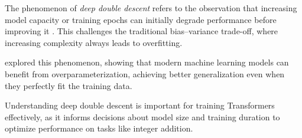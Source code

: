 The phenomenon of \emph{deep double descent} refers to the observation that increasing model capacity or training epochs can initially degrade performance before improving it \parencite{nakkiran_deep_2021}. This challenges the traditional bias–variance trade-off, where increasing complexity always leads to overfitting.

\textcite{belkin_reconciling_2019} explored this phenomenon, showing that modern machine learning models can benefit from overparameterization, achieving better generalization even when they perfectly fit the training data.

Understanding deep double descent is important for training Transformers effectively, as it informs decisions about model size and training duration to optimize performance on tasks like integer addition.

